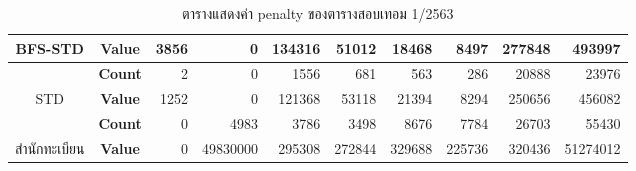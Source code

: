 \begin{table}[]
{\begin{tabular}{@{}ccrrrrrrrr@{}}
    \multirow{-2}{*}{BFS-STD}                    & \textbf{Value}                        & 3856                        & 0                        & 134316                        & 51012                        & 18468                        & 8497                        & 277848                        & 493997                        \\ \midrule
    {\color[HTML]{FE0000} }                      & {\color[HTML]{FE0000} \textbf{Count}} & {\color[HTML]{FE0000} 2}    & {\color[HTML]{FE0000} 0} & {\color[HTML]{FE0000} 1556}   & {\color[HTML]{FE0000} 681}   & {\color[HTML]{FE0000} 563}   & {\color[HTML]{FE0000} 286}  & {\color[HTML]{FE0000} 20888}  & {\color[HTML]{FE0000} 23976}  \\ \cmidrule(l){2-10} 
    \multirow{-2}{*}{{\color[HTML]{FE0000} STD}} & {\color[HTML]{FE0000} \textbf{Value}} & {\color[HTML]{FE0000} 1252} & {\color[HTML]{FE0000} 0} & {\color[HTML]{FE0000} 121368} & {\color[HTML]{FE0000} 53118} & {\color[HTML]{FE0000} 21394} & {\color[HTML]{FE0000} 8294} & {\color[HTML]{FE0000} 250656} & {\color[HTML]{FE0000} 456082} \\ \midrule
                                                 & \textbf{Count}                        & 0                           & 4983                     & 3786                           & 3498                           & 8676                           & 7784                   & 26703                         & 55430                         \\ \cmidrule(l){2-10} 
    \multirow{-2}{*}{สำนักทะเบียน}                  & \textbf{Value}                        & 0                           & 49830000                 & 295308                         & 272844                         & 329688                         & 225736                 & 320436                        & 51274012                      \\ \bottomrule
    \end{tabular}%
    }
    \caption{ตารางแสดงค่า penalty ของตารางสอบเทอม 1/2563}
    \label{tab:result_table_163}
\end{table}
